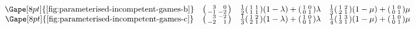 \[\begin{array}{ c c c c }
    \Gape[8pt]{\text{\autoref{fig:parameterised-incompetent-games-b}}} &
        \begin{psmallmatrix*}[r] 
            3 & 0 \\
            -1 & -2 \\
        \end{psmallmatrix*} &
        \frac{1}{2}
        \begin{psmallmatrix}
            1 & 1 \\
            1 & 1 \\
        \end{psmallmatrix}
        (1 - \lambda) +
        \begin{psmallmatrix}
            1 & 0 \\
            0 & 1 \\
        \end{psmallmatrix}
        \lambda &
        \frac{1}{3}
        \begin{psmallmatrix}
            1 & 2 \\
            2 & 1 \\
        \end{psmallmatrix}
        (1 - \mu) +
        \begin{psmallmatrix}
            1 & 0 \\
            0 & 1 \\
        \end{psmallmatrix}
        \mu \\

    \Gape[8pt]{\text{\autoref{fig:parameterised-incompetent-games-c}}} &
        \begin{psmallmatrix*}[r] 
            3 & -2 \\
            -2 & 1 \\
        \end{psmallmatrix*} &
        \frac{1}{3}
        \begin{psmallmatrix}
            1 & 2 \\
            2 & 1 \\
        \end{psmallmatrix}
        (1 - \lambda) +
        \begin{psmallmatrix}
            1 & 0 \\
            0 & 1 \\
        \end{psmallmatrix}
        \lambda &
        \frac{1}{4}
        \begin{psmallmatrix}
            1 & 3 \\
            3 & 1 \\
        \end{psmallmatrix}
        (1 - \mu) +
        \begin{psmallmatrix}
            1 & 0 \\
            0 & 1 \\
        \end{psmallmatrix}
        \mu \\


\end{array}\]
